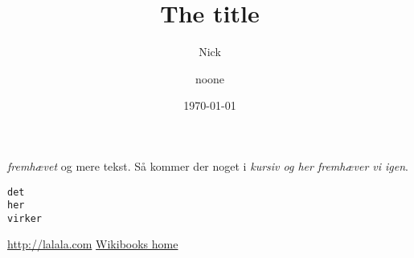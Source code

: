 

\title{The title}

\author{Nick \and noone}
\date{\today}


\maketitle
\emph{fremhævet} og mere tekst.
Så kommer der noget i \textit{kursiv
og her \emph{fremhæver} vi igen}.

\begin{alltt}
det 
	her
		virker
\end{alltt}
\url{http://lalala.com}
\href{http://www.wikibooks.org}{Wikibooks home}

